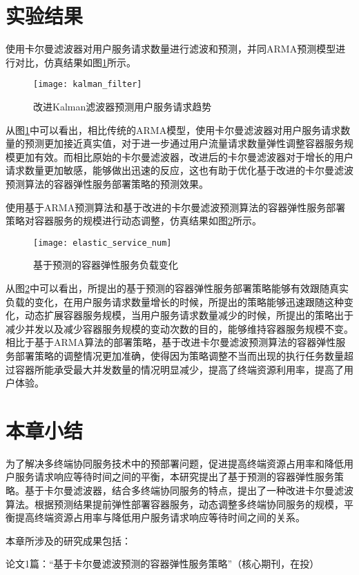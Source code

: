 

\section{实验结果}\label{sec:elastic_service_experiment_results}

使用卡尔曼滤波器对用户服务请求数量进行滤波和预测，并同ARMA预测模型进行对比，仿真结果如图\ref{fig:elastic_service_kalman_filter}所示。

\begin{figure}[!htbp]
    \centering
    \texttt{[image: kalman\_filter]}\hfill
  \caption{改进Kalman滤波器预测用户服务请求趋势}
  \label{fig:elastic_service_kalman_filter}
\end{figure}

从图\ref{fig:elastic_service_kalman_filter}中可以看出，相比传统的ARMA模型，使用卡尔曼滤波器对用户服务请求数量的预测更加接近真实值，对于进一步通过用户流量请求数量弹性调整容器服务规模更加有效。而相比原始的卡尔曼滤波器，改进后的卡尔曼滤波器对于增长的用户请求数量更加敏感，能够做出迅速的反应，这也有助于优化基于改进的卡尔曼滤波预测算法的容器弹性服务部署策略的预测效果。

使用基于ARMA预测算法和基于改进的卡尔曼滤波预测算法的容器弹性服务部署策略对容器服务的规模进行动态调整，仿真结果如图\ref{fig:elastic_service_num}所示。

\begin{figure}[!htbp]
    \centering
    \texttt{[image: elastic\_service\_num]}\hfill
  \caption{基于预测的容器弹性服务负载变化}
  \label{fig:elastic_service_num}
\end{figure}

从图\ref{fig:elastic_service_num}中可以看出，所提出的基于预测的容器弹性服务部署策略能够有效跟随真实负载的变化，在用户服务请求数量增长的时候，所提出的策略能够迅速跟随这种变化，动态扩展容器服务规模，当用户服务请求数量减少的时候，所提出的策略出于减少并发以及减少容器服务规模的变动次数的目的，能够维持容器服务规模不变。相比于基于ARMA算法的部署策略，基于改进卡尔曼滤波预测算法的容器弹性服务部署策略的调整情况更加准确，使得因为策略调整不当而出现的执行任务数量超过容器所能承受最大并发数量的情况明显减少，提高了终端资源利用率，提高了用户体验。

\section{本章小结}\label{sec:elastic_service_summary}

为了解决多终端协同服务技术中的预部署问题，促进提高终端资源占用率和降低用户服务请求响应等待时间之间的平衡，本研究提出了基于预测的容器弹性服务策略。基于卡尔曼滤波器，结合多终端协同服务的特点，提出了一种改进卡尔曼滤波算法。根据预测结果提前弹性部署容器服务，动态调整多终端协同服务的规模，平衡提高终端资源占用率与降低用户服务请求响应等待时间之间的关系。

本章所涉及的研究成果包括：

论文1篇：“基于卡尔曼滤波预测的容器弹性服务策略”（核心期刊，在投）